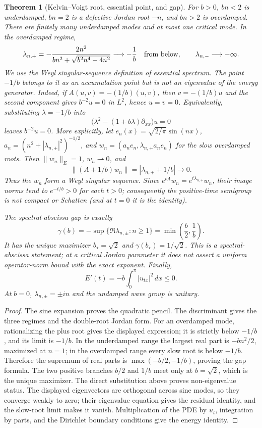 \documentclass[11pt]{article}
\newtheorem{theorem}{Theorem}
\begin{document}
\begin{theorem}[Kelvin--Voigt root, essential point, and gap]\label{thm:kv}
For \(b>0\), \(bn<2\) is underdamped, \(bn=2\) is a defective Jordan root
\(-n\), and \(bn>2\) is overdamped.  There are finitely many underdamped
modes and at most one critical mode.  In the overdamped regime,
\[
 \lambda_{n,+}=-\frac{2n^2}{bn^2+\sqrt{b^2n^4-4n^2}}
 \longrightarrow-\frac1b\quad\hbox{from below},\qquad
 \lambda_{n,-}\longrightarrow-\infty .
\]
We use the Weyl singular-sequence definition of essential spectrum.  The point
\(-1/b\) belongs to it as an accumulation point but is not an eigenvalue of
 the energy generator.  Indeed, if \(A(u,v)=-(1/b)(u,v)\), then
 \(v=-(1/b)u\) and the second component gives \(b^{-2}u=0\) in \(L^2\),
 hence \(u=v=0\).  Equivalently, substituting
\(\lambda=-1/b\) into
\[
 \bigl(\lambda^2-(1+b\lambda)\partial_{xx}\bigr)u=0
\]
leaves \(b^{-2}u=0\).  More explicitly, let
\(e_n(x)=\sqrt{2/\pi}\sin(nx)\), \(a_n=(n^2+|\lambda_{n,+}|^2)^{-1/2}\), and
\(w_n=(a_ne_n,\lambda_{n,+}a_ne_n)\) for the slow overdamped roots.  Then
\(\|w_n\|_E=1\), \(w_n\rightharpoonup0\), and
\[
\|(A+1/b)w_n\|=|\lambda_{n,+}+1/b|\longrightarrow0 .
\]
Thus the \(w_n\) form a Weyl singular sequence.  Since
\(e^{tA}w_n=e^{t\lambda_{n,+}}w_n\), their image norms tend to
\(e^{-t/b}>0\) for each \(t>0\); consequently the positive-time semigroup
is not compact or Schatten (and at \(t=0\) it is the identity).

The spectral-abscissa gap is exactly
\[
 \gamma(b)=-\sup\{\Re\lambda_{n,\pm}:n\ge1\}
          =\min\left(\frac b2,\frac1b\right).
\]
It has the unique maximizer \(b_\star=\sqrt2\) and
\(\gamma(b_\star)=1/\sqrt2\).  This is a spectral-abscissa statement; at a
critical Jordan parameter it does not assert a uniform operator-norm bound
with the exact exponent.  Finally,
\[
 E'(t)=-b\int_0^\pi |u_{tx}|^2\,dx\leq0 .
\]
At \(b=0\), \(\lambda_{n,\pm}=\pm in\) and the undamped wave group is unitary.
\end{theorem}

\begin{proof}
The sine expansion proves the quadratic pencil.  The discriminant gives the
three regimes and the double-root Jordan form.  For an overdamped mode,
rationalizing the plus root gives the displayed expression; it is strictly
below \(-1/b\), and its limit is \(-1/b\).  In the underdamped range the
largest real part is \(-bn^2/2\), maximized at \(n=1\); in the overdamped range
every slow root is below \(-1/b\).  Therefore the supremum of real parts is
\(\max(-b/2,-1/b)\), proving the gap formula.  The two positive branches
\(b/2\) and \(1/b\) meet only at \(b=\sqrt2\), which is the unique maximizer.
The direct substitution above proves non-eigenvalue status.  The displayed
eigenvectors are orthogonal across sine modes, so they converge weakly to zero;
their eigenvalue equation gives the residual identity, and the slow-root limit
makes it vanish.
Multiplication of the PDE by \(u_t\), integration by parts, and the Dirichlet
boundary conditions give the energy identity.
\end{proof}
\end{document}
